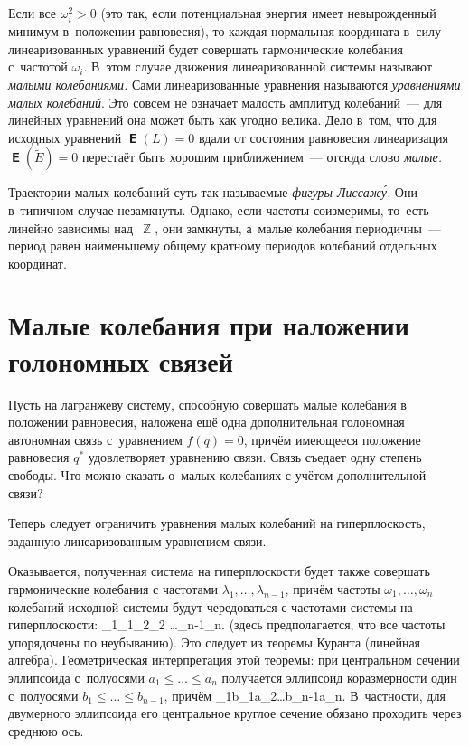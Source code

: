 \documentclass[a4paper,11pt]{article}
\def\[#1\]{\begin{align*}#1\end{align*}}
\theoremstyle{definition}
\begin{document}
Если все $\omega_i^2>0$ (это так, если потенциальная энергия имеет
невырожденный минимум в~положении равновесия), то каждая нормальная координата
в~силу линеаризованных уравнений будет совершать гармонические колебания
с~частотой $\omega_i$. В~этом случае движения линеаризованной системы называют
\emph{малыми колебаниями.} Сами линеаризованные уравнения называются
\emph{уравнениями малых колебаний}. Это совсем не означает малость амплитуд
колебаний~— для линейных уравнений она может быть как угодно велика. Дело
в~том, что для исходных уравнений $\mbfsansE(L)=0$ вдали от состояния
равновесия линеаризация $\mbfsansE(\tilde E)=0$ перестаёт быть хорошим
приближением~— отсюда слово \emph{малые.}

Траектории малых колебаний суть так называемые \emph{фигуры Лиссажу́.} Они
в~типичном случае незамкнуты. Однако, если частоты соизмеримы, то~есть линейно
зависимы над~$\BbbZ$, они замкнуты, а~малые колебания периодичны~— период
равен наименьшему общему кратному периодов колебаний отдельных координат.

\section{Малые колебания при наложении голономных связей}

Пусть на лагранжеву систему, способную совершать малые колебания в положении
равновесия, наложена ещё одна дополнительная голономная автономная связь
с~уравнением $f(q)=0$, причём имеющееся положение равновесия $q^*$
удовлетворяет уравнению связи. Связь съедает одну степень свободы. Что можно
сказать о~малых колебаниях с учётом дополнительной связи?

Теперь следует ограничить уравнения малых колебаний на гиперплоскость, заданную
линеаризованным уравнением связи.

Оказывается, полученная система на гиперплоскости будет также совершать
гармонические колебания с частотами $\lambda_1,\ldots,\lambda_{n-1}$, причём
частоты $\omega_1,\ldots,\omega_n$ колебаний исходной системы будут
чередоваться с частотами системы на гиперплоскости:
	\[
	\omega_1\leqslant\lambda_1\leqslant\omega_2\leqslant\lambda_2
		\leqslant\ldots\leqslant\lambda_{n-1}\leqslant\omega_n.
	\]
(здесь предполагается, что все частоты упорядочены по неубыванию). Это следует
из теоремы Куранта (линейная алгебра). Геометрическая интерпретация этой
теоремы: при центральном сечении эллипсоида с~полуосями
$a_1\leqslant\ldots\leqslant a_n$ получается эллипсоид коразмерности один
с~полуосями $b_1\leqslant\ldots\leqslant b_{n-1}$, причём
	\[
	a_1\leqslant b_1\leqslant a_2\leqslant\ldots\leqslant b_{n-1}\leqslant a_n.
	\]
В~частности, для двумерного эллипсоида его центральное круглое сечение обязано
проходить через среднюю ось.
\end{document}

